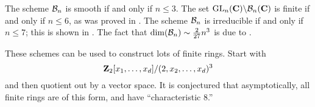 The scheme $\mathcal{B}_n$ is smooth if and only if $n\leqslant 3$. The set 
$\operatorname{GL}_n(\mathbf{C})\backslash \mathcal{B}_n(\mathbf{C})$ is finite if and only if 
$n\leqslant 6$, as was proved in \cite{c54,d66,s56}. %
The scheme $\mathcal{B}_n$ is irreducible if and only if $n\leqslant 7$; this is 
shown in \cite{cdvv09}. %
The fact that $\dim(\mathcal{B}_n)\sim \frac{2}{27} n^3$ is due to \cite{n87,p08}. 

These schemes can be used to construct lots of finite rings. Start with 
\[
  \mathbf{Z}_2[x_1,\dots,x_d]/(2,x_2,\dots,x_d)^3
\]
and then quotient out by a vector space. It is conjectured that asymptotically, 
all finite rings are of this form, and have ``characteristic $8$.'' 





